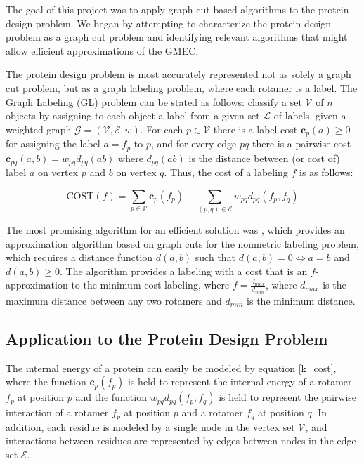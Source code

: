 \documentclass[11pt]{article}
\begin{document}
	The goal of this project was to apply graph cut-based algorithms to the protein
	design problem. We began by attempting to characterize the protein design problem
	as a graph cut problem and identifying relevant algorithms that might allow
	efficient approximations of the GMEC. 
	
	The protein design problem is most accurately represented not as solely a
	graph cut problem, but as a graph labeling problem, where each rotamer is a label.
	The Graph Labeling (GL) problem can be stated as follows: classify a set 
	$\mathcal{V}$ of $n$ objects by assigning to each object a label from a given
	set $\mathcal{L}$ of labels, given a weighted graph
	$\mathcal{G}=(\mathcal{V},\mathcal{E},w)$. For each $p \in \mathcal{V}$ there
	is a label cost $\textbf{c}_{p}(a) \geq 0$ for assigning the label $a=f_p$ to
	$p$, and for every edge $pq$ there is a pairwise cost
	$\textbf{c}_{pq}(a,b) =  w_{pq}d_{pq}(ab)$ where $d_{pq}(ab)$ is the distance
	between (or cost of) label $a$ on vertex $p$ and $b$ on vertex $q$. Thus,
	the cost of a labeling $f$ is as follows:
		
	\begin{equation} \label{k_cost}
			\text{COST}(f) = 
			\sum\limits_{p \in \mathcal{V}} \textbf{c}_{p}(f_p) + 
			\sum\limits_{(p,q) \in \mathcal{E}} w_{pq}d_{pq}(f_p,f_q)
		\end{equation}

	The most promising algorithm for an efficient solution was \cite{Karmarkar}, 
	which provides an approximation algorithm based on graph cuts for the 
	nonmetric labeling problem, which requires a distance function $d(a,b)$ such
	that $d(a,b)=0 \iff a=b$ and $d(a,b) \geq 0$. The algorithm provides a labeling 
	with a cost that is an $f$-approximation to the minimum-cost labeling, where
	$f = \frac{d_{max}}{d_{min}}$, where $d_{max}$ is the maximum distance between
	any two rotamers and $d_{min}$ is the minimum distance. 

	\subsection{Application to the Protein Design Problem}
	
	The internal energy of a protein can easily be modeled by equation \ref{k_cost},
	where the function $\textbf{c}_{p}(f_p)$ is held to represent the internal
	energy of a rotamer $f_p$ at position $p$ and the function 
	$w_{pq}d_{pq}(f_p, f_q)$ is held to represent the pairwise interaction of a
	rotamer $f_p$ at position $p$ and a rotamer $f_q$ at position $q$. 	In addition,
	each residue is modeled by a single node in the vertex set $\mathcal{V}$, and
	interactions between residues are represented by edges between nodes in the edge
	set $\mathcal{E}$. 
	
\end{document}
